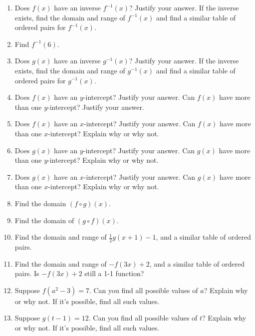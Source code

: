 \documentclass{ximera}
\begin{document}
\begin{enumerate}
\begin{enumerate}
\item Does $f(x)$ have an inverse $f^{-1}(x)$? Justify your answer. If the inverse exists, find the domain and range of $f^{-1}(x)$ and find a similar table of ordered pairs for $f^{-1}(x)$. 
\item Find $f^{-1}(6)$.
\item Does $g(x)$ have an inverse $g^{-1}(x)$? Justify your answer. If the inverse exists, find the domain and range of $g^{-1}(x)$ and find a similar table of ordered pairs for $g^{-1}(x)$.
\item Does $f(x)$ have an $y$-intercept? Justify your answer. Can $f(x)$ have more than one $y$-intercept? Justify your answer.
\item Does $f(x)$ have an $x$-intercept? Justify your answer. Can $f(x)$ have more than one $x$-intercept? Explain why or why not.
\item Does $g(x)$ have an $y$-intercept? Justify your answer. Can $g(x)$ have more than one $y$-intercept? Explain why or why not.
\item Does $g(x)$ have an $x$-intercept? Justify your answer. Can $g(x)$ have more than one $x$-intercept? Explain why or why not.
\item Find the domain $(f\circ g)(x)$.
\item Find the domain of $(g\circ f)(x)$. 

\item Find the domain and range of $\displaystyle \frac{1}{2}g(x+1)-1$, and a similar table of ordered pairs.
\item Find the domain and range of $-f(3x)+2$, and a similar table of ordered pairs. Is $-f(3x)+2$ still a 1-1 function?
\item Suppose $f(a^2-3)=7$. Can you find all possible values of $a$? Explain why or why not. If it's possible, find all such values. 
\item Suppose $g(t-1)=12$. Can you find all possible values of $t$? Explain why or why not. If it's possible, find all such values.
\end{enumerate}


\end{enumerate}
\end{document}
